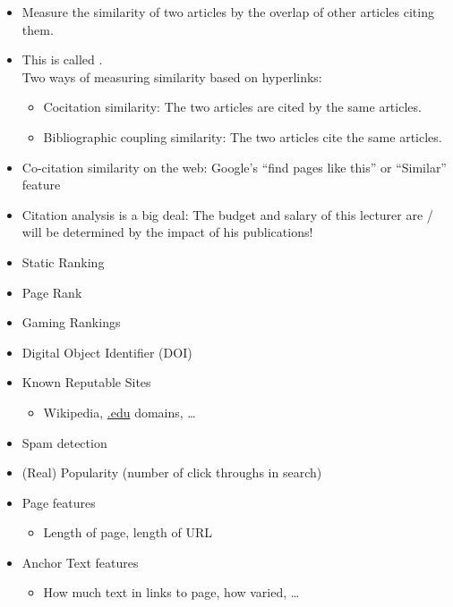 \documentclass[a4paper,landscape,headrule,footrule,xetex]{foils}
\begin{document}
\begin{itemize}
\item Measure the similarity of two articles by the overlap
  of other articles citing them.
\item This is called .
\\ Two ways of measuring similarity based on hyperlinks:
\begin{itemize}
\item Cocitation similarity: The two articles are cited by the
  same articles.
\item Bibliographic coupling similarity: The two articles
  cite the
  same articles.
\end{itemize}
\item Co-citation similarity on the web: Google's ``find
  pages like this'' or ``Similar'' feature
\item Citation analysis is a big deal: The budget and salary
  of this lecturer are / will be determined by the impact of
  his publications!
\end{itemize}






\begin{itemize}
\item Static Ranking
\item Page Rank
\item Gaming Rankings
\item Digital Object Identifier (DOI)
\end{itemize}



\begin{itemize}
\item Known Reputable  Sites
\begin{itemize}
\item Wikipedia, \url{.edu} domains, \ldots
\end{itemize}
\item  Spam detection
\item (Real) Popularity (number of click throughs in search)
\item  Page features
  \begin{itemize}
  \item Length of page, length of URL
  \end{itemize}
\item Anchor Text features
\begin{itemize}
\item How much text in links to page, how varied,  \ldots 
\end{itemize}
\end{itemize}
\end{document}
